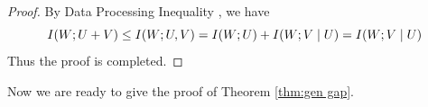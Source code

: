 \begin{proof}
	By Data Processing Inequality \citep{xu2017information}, we have 
	\begin{equation}
		\small
			I(W; U + V) \leq I(W; U, V) = I(W; U) + I(W; V\mid U) = I(W; V\mid U)
	\end{equation}
	Thus the proof is completed. 
\end{proof}
Now we are ready to give the proof of Theorem \ref{thm:gen gap}.
\gengap*

